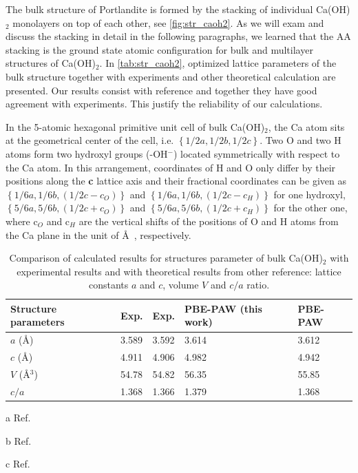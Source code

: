 The bulk structure of Portlandite is formed by the stacking of individual Ca(OH)$_2$ monolayers on top of each other, see \autoref{fig:str_caoh2}. As we will exam and discuss the stacking in detail in the following paragraphs, we learned that the AA stacking is the ground state atomic configuration for bulk and multilayer structures of Ca(OH)$_2$. In \autoref{tab:str_caoh2}, optimized lattice parameters of the bulk structure together with experiments and other theoretical calculation are presented. Our results consist with reference \cite{Pishtshev} and together they have good agreement with experiments. This justify the reliability of our calculations. 

In the 5-atomic hexagonal primitive unit cell of bulk Ca(OH)$_2$, the Ca atom sits at the geometrical
center of the cell, i.e. $\left\lbrace 1/2a, 1/2b,
1/2c \right\rbrace$. Two O and two H atoms form two hydroxyl groups 
(-OH$^-$) located symmetrically with respect to the Ca atom. In this 
arrangement, coordinates of H and O only differ by their positions along the 
\textbf{c} lattice axis and their fractional coordinates can be given as
$\left\lbrace1/6a, 1/6b, (1/2c-c_O) \right\rbrace$ and $\left\lbrace 
1/6a, 1/6b, (1/2c-c_H) \right\rbrace$ for one hydroxyl,
$\left\lbrace 5/6a, 5/6b, (1/2c+c_O) \right\rbrace$
and $\left\lbrace 5/6a, 5/6b, (1/2c+c_H)
\right\rbrace$ for the other one, where c$_O$ and c$_H$ are the vertical shifts
of the positions of O and H atoms from the Ca plane in the unit of \AA~, respectively. 

\begin{table}
\centering
\caption{\label{tab:str_caoh2}
Comparison of calculated results for structures parameter of bulk Ca(OH)$_2$ with experimental results and with theoretical results from other reference: lattice constants 
$a$ and $c$, volume $V$ and $c/a$ ratio. }
\begin{threeparttable}
\begin{tabularx}{0.92\linewidth}{X|XXXX}
\hline\hline
Structure parameters & Exp. \tnote{a} & Exp. \tnote{b} & PBE-PAW (this work) & PBE-PAW \tnote{c}  \\
\hline

$a$ (\AA)                   & 3.589 & 3.592 & 3.614 & 3.612 \\
$c$ (\AA)                   & 4.911 & 4.906 & 4.982 & 4.942 \\
$V$ (\AA$^3$)               & 54.78 & 54.82 & 56.35 & 55.85 \\
$c/a$                       & 1.368 & 1.366 & 1.379 & 1.368 \\

\hline\hline

\end{tabularx}
\begin{tablenotes}
\begin{footnotesize}
\item[a]Ref. \cite{exp.1}
\item[b]Ref. \cite{exp.2}
\item[c]Ref. \cite{Pishtshev}
\end{footnotesize}
\end{tablenotes}
\end{threeparttable}
\end{table}

